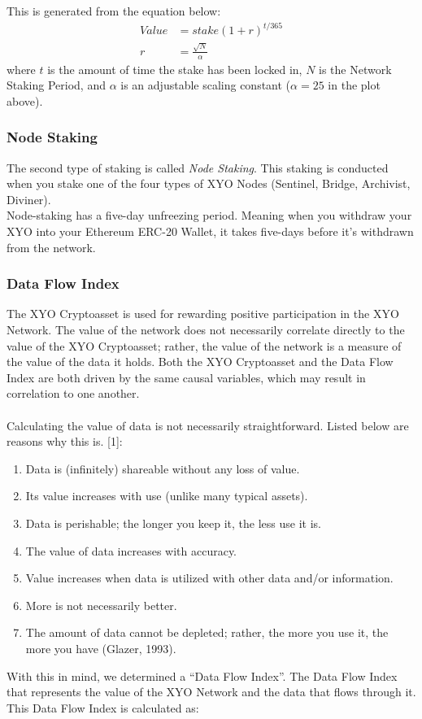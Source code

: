 \documentclass{article}
\begin{document}
This is generated from the equation below:
\begin{align}
    Value &= stake(1+r)^{t/365}\\
    r &= \frac{\sqrt{N}}{\alpha}
\end{align}
where $t$ is the amount of time the stake has been locked in, $N$ is the Network Staking Period, and $\alpha$ is an adjustable scaling constant ($\alpha = 25$ in the plot above).

\subsubsection{Node Staking}

The second type of staking is called \textit{Node Staking}. This staking is conducted when you stake one of the four types of XYO Nodes (Sentinel, Bridge, Archivist, Diviner).\\ 

Node-staking has a five-day unfreezing period. Meaning when you withdraw your XYO into your Ethereum ERC-20 Wallet, it takes five-days before it’s withdrawn from the network.

\subsubsection{Data Flow Index}

The XYO Cryptoasset is used for rewarding positive participation in the XYO Network. The value of the network does not necessarily correlate directly to the value of the XYO Cryptoasset; rather, the value of the network is a measure of the value of the data it holds. Both the XYO Cryptoasset and the Data Flow Index are both driven by the same causal variables, which may result in correlation to one another. \\\\

Calculating the value of data is not necessarily straightforward. Listed below are reasons why this is. [1]:

\begin{enumerate}
  \item Data is (infinitely) shareable without any loss of value.
  \item Its value increases with use (unlike many typical assets).
  \item Data is perishable; the longer you keep it, the less use it is.
  \item The value of data increases with accuracy.
  \item Value increases when data is utilized with other data and/or information.
  \item More is not necessarily better.
  \item The amount of data cannot be depleted; rather, the more you use it, the more you have (Glazer, 1993).
\end{enumerate}
With this in mind, we determined a ``Data Flow Index''. The Data Flow Index that represents the value of the XYO Network and the data that flows through it. This Data Flow Index is calculated as:
\end{document}
